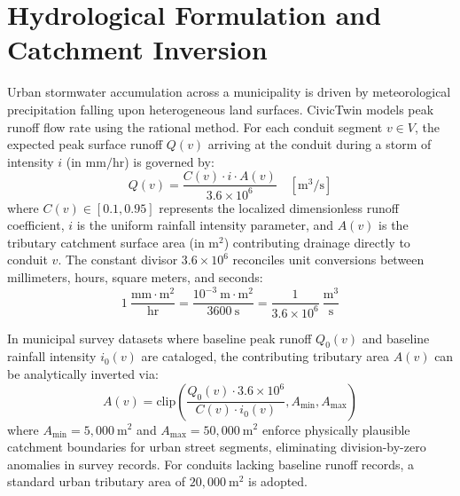 \documentclass[12pt,a4paper]{report}
\begin{document}
\section{Hydrological Formulation and Catchment Inversion}
Urban stormwater accumulation across a municipality is driven by meteorological precipitation falling upon heterogeneous land surfaces. CivicTwin models peak runoff flow rate using the rational method. For each conduit segment $v \in V$, the expected peak surface runoff $Q(v)$ arriving at the conduit during a storm of intensity $i$ (in $\text{mm}/\text{hr}$) is governed by:
\begin{equation}
Q(v) = \frac{C(v) \cdot i \cdot A(v)}{3.6 \times 10^6} \quad [\text{m}^3/\text{s}]
\label{eqn:rational_specific}
\end{equation}
where $C(v) \in [0.1, 0.95]$ represents the localized dimensionless runoff coefficient, $i$ is the uniform rainfall intensity parameter, and $A(v)$ is the tributary catchment surface area (in $\text{m}^2$) contributing drainage directly to conduit $v$. The constant divisor $3.6 \times 10^6$ reconciles unit conversions between millimeters, hours, square meters, and seconds:
\begin{equation}
1~\frac{\text{mm} \cdot \text{m}^2}{\text{hr}} = \frac{10^{-3}~\text{m} \cdot \text{m}^2}{3600~\text{s}} = \frac{1}{3.6 \times 10^6}~\frac{\text{m}^3}{\text{s}}
\end{equation}

In municipal survey datasets where baseline peak runoff $Q_0(v)$ and baseline rainfall intensity $i_0(v)$ are cataloged, the contributing tributary area $A(v)$ can be analytically inverted via:
\begin{equation}
A(v) = \text{clip}\left(\frac{Q_0(v) \cdot 3.6 \times 10^6}{C(v) \cdot i_0(v)}, A_{\min}, A_{\max}\right)
\label{eqn:area_inversion}
\end{equation}
where $A_{\min} = 5{,}000~\text{m}^2$ and $A_{\max} = 50{,}000~\text{m}^2$ enforce physically plausible catchment boundaries for urban street segments, eliminating division-by-zero anomalies in survey records. For conduits lacking baseline runoff records, a standard urban tributary area of $20{,}000~\text{m}^2$ is adopted.
\end{document}
